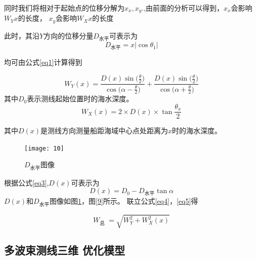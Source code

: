 \documentclass[11pt,twoside,a4paper]{article}
\begin{document}
同时我们将相对于起始点的位移分解为$x_{x},x_{y}$.,由前面的分析可以得到，$x_{x}$会影响$W_Y{x}$的长度，
$x_{y}$会影响$W_X{x}$的长度

此时，其沿$Y$方向的位移分量$D_\text{水平}$可表示为
\begin{equation}
	D_\text{水平}=x |\cos \theta_1|
	\label{eq3}
\end{equation}



均可由公式\ref{eq1}计算得到

 \begin{equation}
	W_Y(x)=\frac{D(x)\sin{(\frac{\theta}{2}})}{\cos{(\alpha-\frac{\theta}{2}})}+\frac{D(x) \sin{(\frac{\theta}{2}})}{\cos{(\alpha+\frac{\theta}{2}})}
	\label{eq4}
\end{equation}
其中$D_0$表示测线起始位置时的海水深度。
\begin{equation}
	W_X(x)=2 \times D(x)\times \tan{\frac{\theta_x}{2}}
\end{equation}


 其中$D(x)$是测线方向测量船距海域中心点处距离为$x$时的海水深度。

 \begin{figure}[h]
	\centering
	\texttt{[image: 10]}
	\caption{$D_\text{水平}$图像}
	\label{8}
\end{figure}



根据公式\ref{eq3},$D(x)$可表示为
 \begin{equation}
	D(x)=D_0-D_\text{水平}\tan{\alpha}
	\label{eq5}
\end{equation}
$D(x)$和$D_\text{水平}$图像如图\ref{8}，图\ref{9}所示。
联立公式\ref{eq4}，\ref{eq5}得

	
\begin{equation}
	W_{\text {总 }}=\sqrt{W_Y^2+W_X^2(x)}
\end{equation}

\subsection{多波束测线三维 优化模型}
\end{document}
